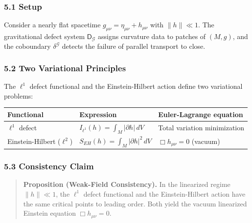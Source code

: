 \documentclass[
]{article}
\begin{document}
\subsubsection{5.1 Setup}\label{setup}

Consider a nearly flat spacetime
\(g_{\mu\nu} = \eta_{\mu\nu} + h_{\mu\nu}\) with \(\|h\| \ll 1\). The
gravitational defect system \(\mathsf{D}_\mathcal{G}\) assigns curvature
data to patches of \((M, g)\), and the coboundary \(\delta^\mathcal{G}\)
detects the failure of parallel transport to close.

\subsubsection{5.2 Two Variational
Principles}\label{two-variational-principles}

The \(\ell^1\) defect functional and the Einstein-Hilbert action define
two variational problems:

\begin{longtable}[]{@{}
  >{\raggedright\arraybackslash}p{}
  >{\raggedright\arraybackslash}p{}
  >{\raggedright\arraybackslash}p{}@{}}
\toprule\noalign{}
\begin{minipage}[b]{\linewidth}\raggedright
Functional
\end{minipage} & \begin{minipage}[b]{\linewidth}\raggedright
Expression
\end{minipage} & \begin{minipage}[b]{\linewidth}\raggedright
Euler-Lagrange equation
\end{minipage} \\
\midrule\noalign{}
\endhead
\bottomrule\noalign{}
\endlastfoot
\(\ell^1\) defect & \(I_{\ell^1}(h) = \int_M |\partial h| \, dV\) &
Total variation minimization \\
Einstein-Hilbert (\(\ell^2\)) &
\(S_{EH}(h) = \int_M |\partial h|^2 \, dV\) & \(\Box h_{\mu\nu} = 0\)
(vacuum) \\
\end{longtable}

\subsubsection{5.3 Consistency Claim}\label{consistency-claim}

\begin{quote}
\textbf{Proposition (Weak-Field Consistency).} In the linearized regime
\(\|h\| \ll 1\), the \(\ell^1\) defect functional and the
Einstein-Hilbert action have the same critical points to leading order.
Both yield the vacuum linearized Einstein equation
\(\Box h_{\mu\nu} = 0\).
\end{quote}
\end{document}

